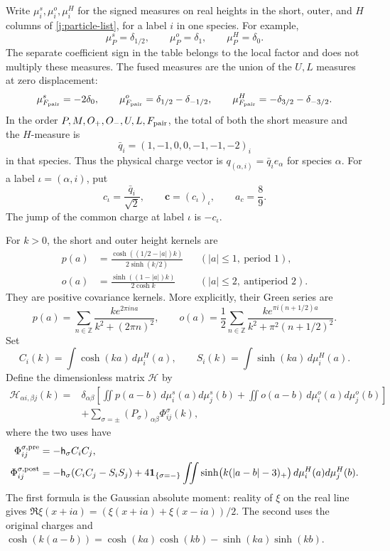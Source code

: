 Write \(\mu_i^s,\mu_i^o,\mu_i^H\) for the signed measures on real heights in the short, outer, and \(H\) columns of \eqref{j:particle-list}, for a label \(i\) in one species. For example,
\[
\mu_P^s=\delta_{1/2},\qquad
\mu_P^o=\delta_1,\qquad
\mu_P^H=\delta_0.
\]
The separate coefficient sign in the table belongs to the local factor and does not multiply these measures. The fused measures are the union of the \(U,L\) measures at zero displacement:
\[
\mu_{F_{\rm pair}}^s=-2\delta_0,\qquad
\mu_{F_{\rm pair}}^o=\delta_{1/2}-\delta_{-1/2},\qquad
\mu_{F_{\rm pair}}^H=-\delta_{3/2}-\delta_{-3/2}.
\]
In the order \(P,M,O_+,O_-,U,L,F_{\rm pair}\), the total of both the short measure and the \(H\)-measure is
\[
\bar q_i=(1,-1,0,0,-1,-1,-2)_i
\]
in that species. Thus the physical charge vector is \(q_{(\alpha,i)}=\bar q_i e_\alpha\) for species \(\alpha\). For a label \(\iota=(\alpha,i)\), put
\[
c_\iota=\frac{\bar q_i}{\sqrt2},\qquad
\boldsymbol c=(c_\iota)_\iota,\qquad a_c=\frac89.
\]
The jump of the common charge at label \(\iota\) is \(-c_\iota\).

For \(k>0\), the short and outer height kernels are
\[
\begin{aligned}
p(a)&=\frac{\cosh((1/2-|a|)k)}{2\sinh(k/2)}
       &&(|a|\le1,\ \text{period }1),\\
o(a)&=\frac{\sinh((1-|a|)k)}{2\cosh k}
       &&(|a|\le2,\ \text{antiperiod }2).
\end{aligned}
\]
They are positive covariance kernels. More explicitly, their Green series are
\[
p(a)=\sum_{n\in\mathbb Z}\frac{k e^{2\pi ina}}{k^2+(2\pi n)^2},
\qquad
o(a)=\frac12\sum_{n\in\mathbb Z}
\frac{k e^{\pi i(n+1/2)a}}{k^2+\pi^2(n+1/2)^2}.
\]
Set
\[
C_i(k)=\int\cosh(ka)\,d\mu_i^H(a),\qquad
S_i(k)=\int\sinh(ka)\,d\mu_i^H(a).
\]
Define the dimensionless matrix \(\mathcal H\) by
\begin{equation}\label{j:height-matrix}
\begin{aligned}
\mathcal H_{\alpha i,\beta j}(k)
={}&\delta_{\alpha\beta}
\left[
\iint p(a-b)\,d\mu_i^s(a)d\mu_j^s(b)
+\iint o(a-b)\,d\mu_i^o(a)d\mu_j^o(b)
\right]\\
&+\sum_{\sigma=\pm}(P_\sigma)_{\alpha\beta}\Phi^\sigma_{ij}(k),
\end{aligned}
\end{equation}
where the two uses have
\[
\begin{aligned}
\Phi^{\sigma,{\rm pre}}_{ij}
&=-\mathsf h_\sigma C_iC_j,\\
\Phi^{\sigma,{\rm post}}_{ij}
&=-\mathsf h_\sigma(C_iC_j-S_iS_j)
+4\mathbf1_{\{\sigma=-\}}\iint
\sinh\!\big(k(|a-b|-3)_+\big)\,d\mu_i^H(a)d\mu_j^H(b).
\end{aligned}
\]
The first formula is the Gaussian absolute moment: reality of \(\xi\) on the real line gives
\(\Re\xi(x+ia)=(\xi(x+ia)+\xi(x-ia))/2\). The second uses the original charges and
\(\cosh(k(a-b))=\cosh(ka)\cosh(kb)-\sinh(ka)\sinh(kb)\).

